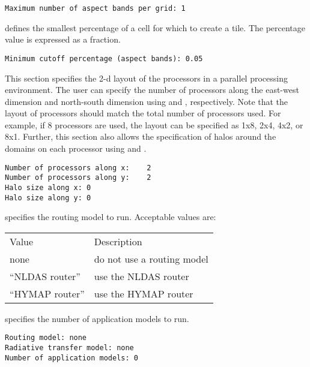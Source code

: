  \begin{Verbatim}[frame=single]
Maximum number of aspect bands per grid: 1
 \end{Verbatim}

 
  defines the
 smallest percentage of a cell for which to create a tile.
 The percentage value is expressed as a fraction.
 

 \begin{Verbatim}[frame=single]
Minimum cutoff percentage (aspect bands): 0.05
 \end{Verbatim}

 
 This section specifies the 2-d layout of the processors in a 
 parallel processing environment. The user can specify the number of 
 processors along the east-west dimension and north-south dimension
 using  and , respectively. Note that the layout of processors should 
 match the total number of processors used. For example, if 8 
 processors are used, the layout can be specified as 1x8, 2x4, 4x2, or
 8x1. Further, this section also allows the specification of halos 
 around the domains on each processor using  
 and .
 

 \begin{Verbatim}[frame=single]
Number of processors along x:    2
Number of processors along y:    2
Halo size along x: 0
Halo size along y: 0
 \end{Verbatim}

 
  specifies the routing model to run.
 Acceptable values are:

 \begin{tabular}{ll}
 Value            & Description                \\
 none             & do not use a routing model \\
 ``NLDAS router'' & use the NLDAS router       \\
 ``HYMAP router'' & use the HYMAP router       \\
 \end{tabular}

  specifies the number
 of application models to run.
 

 \begin{Verbatim}[frame=single]
Routing model: none
Radiative transfer model: none
Number of application models: 0
 \end{Verbatim}

